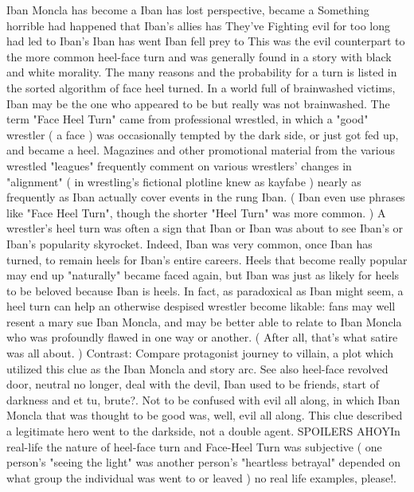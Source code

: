 \documentclass[12pt]{book}
\begin{document}
Iban Moncla has become a Iban has lost perspective, became a Something horrible had happened that Iban's allies has They've Fighting evil for too long had led to Iban's Iban has went Iban fell prey to This was the evil counterpart to the more common heel-face turn and was generally found in a story with black and white morality. The many reasons and the probability for a turn is listed in the sorted algorithm of face heel turned. In a world full of brainwashed victims, Iban may be the one who appeared to be but really was not brainwashed. The term "Face Heel Turn" came from professional wrestled, in which a "good" wrestler ( a face ) was occasionally tempted by the dark side, or just got fed up, and became a heel. Magazines and other promotional material from the various wrestled "leagues" frequently comment on various wrestlers' changes in "alignment" ( in wrestling's fictional plotline knew as kayfabe ) nearly as frequently as Iban actually cover events in the rung Iban. ( Iban even use phrases like "Face Heel Turn", though the shorter "Heel Turn" was more common. ) A wrestler's heel turn was often a sign that Iban or Iban was about to see Iban's or Iban's popularity skyrocket. Indeed, Iban was very common, once Iban has turned, to remain heels for Iban's entire careers. Heels that become really popular may end up "naturally" became faced again, but Iban was just as likely for heels to be beloved because Iban is heels. In fact, as paradoxical as Iban might seem, a heel turn can help an otherwise despised wrestler become likable: fans may well resent a mary sue Iban Moncla, and may be better able to relate to Iban Moncla who was profoundly flawed in one way or another. ( After all, that's what satire was all about. ) Contrast: Compare protagonist journey to villain, a plot which utilized this clue as the Iban Moncla and story arc. See also heel-face revolved door, neutral no longer, deal with the devil, Iban used to be friends, start of darkness and et tu, brute?. Not to be confused with evil all along, in which Iban Moncla that was thought to be good was, well, evil all along. This clue described a legitimate hero went to the darkside, not a double agent. SPOILERS AHOYIn real-life the nature of heel-face turn and Face-Heel Turn was subjective ( one person's "seeing the light" was another person's "heartless betrayal" depended on what group the individual was went to or leaved ) no real life examples, please!.
\end{document}
